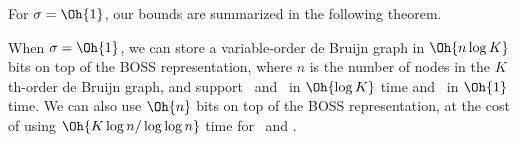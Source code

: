 For \(\sigma = \Oh{1}\), our bounds are summarized in the following theorem. %

\begin{theorem}
\label{thm:bounds}
When \(\sigma = \Oh{1}\), we can store a variable-order de Bruijn graph in $\Oh{n \log K}$ bits on top of the BOSS representation, where $n$
is the number of nodes in the $K$th-order de Bruijn graph, and support \forward\ and \backward\ in $\Oh{\log K}$ time and \lastchar\ in
$\Oh{1}$ time.  We can also use $\Oh{n}$ bits on top of the BOSS representation, at the cost of using $\Oh{K \log n / \log \log n}$ time
for \forward\ and \backward.
\end{theorem}



